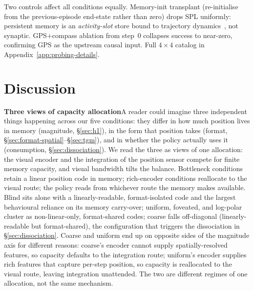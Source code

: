 \documentclass{article}
\newcommand{\uncertain}[1]{#1}
\begin{document}
Two controls affect all conditions equally. Memory-init transplant (re-initialise from the previous-episode end-state rather than zero) drops SPL uniformly: persistent memory is an \emph{activity-slot} store bound to trajectory dynamics~\citep{dorrell2024taleoftwo}, not synaptic. GPS$+$compass ablation from step~0 collapses success to near-zero, confirming GPS as the upstream causal input. Full $4{\times}4$ catalog in Appendix~\ref{app:probing-details}.


\section{Discussion}
\label{sec:discussion}

\noindent\textbf{Three views of capacity allocation}\quad A reader could imagine three independent things happening across our five conditions: they differ in how much position lives in memory (magnitude, §\ref{sec:h1}), in the form that position takes (format, §\ref{sec:format-spatial}--§\ref{sec:tgm}), and in whether the policy actually uses it (consumption, §\ref{sec:dissociation}). We read the three as views of one allocation: the visual encoder and the integration of the position sensor compete for finite memory capacity, and visual bandwidth tilts the balance. Bottleneck conditions retain a linear position code in memory; rich-encoder conditions reallocate to the visual route; the policy reads from whichever route the memory makes available. Blind sits alone with a linearly-readable, format-isolated code and the largest behavioural reliance on its memory carry-over; uniform, foveated, and log-polar cluster as non-linear-only, format-shared codes; coarse falls off-diagonal (linearly-readable but format-shared), the configuration that triggers the dissociation in §\ref{sec:dissociation}. \uncertain{Coarse and uniform end up on opposite sides of the magnitude axis for different reasons: coarse's encoder cannot supply spatially-resolved features, so capacity defaults to the integration route; uniform's encoder supplies rich features that capture per-step position, so capacity is reallocated to the visual route, leaving integration unattended. The two are different regimes of one allocation, not the same mechanism.}
\end{document}
